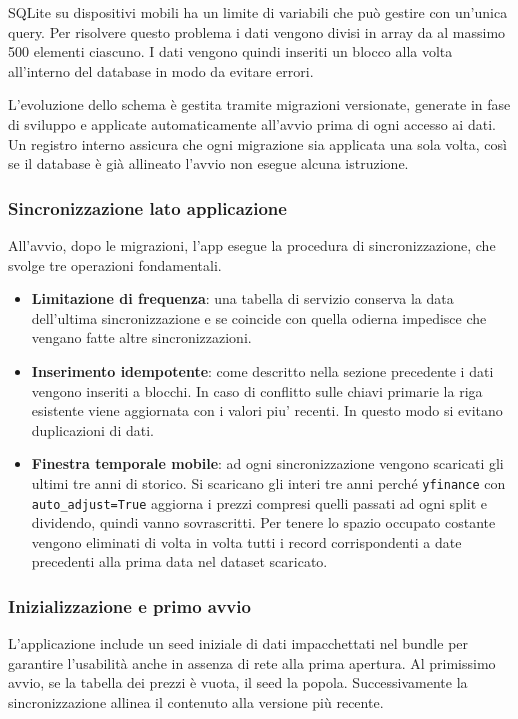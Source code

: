 SQLite su dispositivi mobili ha un limite di variabili che può gestire con un'unica query.
Per risolvere questo problema i dati vengono divisi in array da al massimo 500 elementi ciascuno.
I dati vengono quindi inseriti un blocco alla volta all'interno del database in modo da evitare errori.

L'evoluzione dello schema è gestita tramite migrazioni versionate, generate in fase di sviluppo e applicate automaticamente all'avvio prima di ogni accesso ai dati.
Un registro interno assicura che ogni migrazione sia applicata una sola volta, così se il database è già allineato l'avvio non esegue alcuna istruzione.

\subsubsection{Sincronizzazione lato applicazione}

All'avvio, dopo le migrazioni, l'app esegue la procedura di sincronizzazione, che svolge tre operazioni fondamentali.
\begin{itemize}
  \item \textbf{Limitazione di frequenza}: una tabella di servizio conserva la data dell'ultima sincronizzazione e se coincide con quella odierna impedisce che vengano fatte altre sincronizzazioni.
  \item \textbf{Inserimento idempotente}: come descritto nella sezione precedente i dati vengono inseriti a blocchi.
  In caso di conflitto sulle chiavi primarie la riga esistente viene aggiornata con i valori
  piu' recenti. In questo modo si evitano duplicazioni di dati.
  \item \textbf{Finestra temporale mobile}: ad ogni sincronizzazione vengono scaricati gli ultimi tre anni di storico. 
  Si scaricano gli interi tre anni perché \lstinline{yfinance} con \lstinline{auto_adjust=True} aggiorna i prezzi compresi quelli passati ad ogni split e dividendo, quindi vanno sovrascritti.
  Per tenere lo spazio occupato costante vengono eliminati di volta in volta tutti i record corrispondenti a date precedenti alla prima data nel dataset scaricato.
\end{itemize}

\subsubsection{Inizializzazione e primo avvio}

L'applicazione include un seed iniziale di dati impacchettati nel bundle per garantire l'usabilità anche in assenza di rete alla prima apertura. 
Al primissimo avvio, se la tabella dei prezzi è vuota, il seed la popola. 
Successivamente la sincronizzazione allinea il contenuto alla versione più recente.

